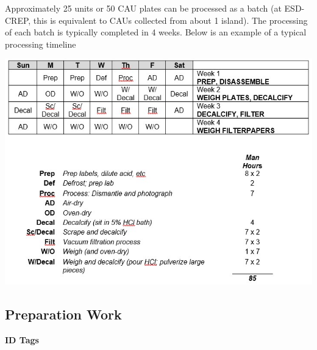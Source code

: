 \documentclass[
]{book}
\begin{document}
Approximately 25 units or 50 CAU plates can be processed as a batch (at ESD-CREP, this is equivalent to CAUs collected from about 1 island). The processing of each batch is typically completed in 4 weeks. Below is an example of a typical processing timeline

\includegraphics{images/CAU_table.jpg}

\hypertarget{preparation-work}{%
\subsection{Preparation Work}\label{preparation-work}}

\textbf{ID Tags}
\end{document}

